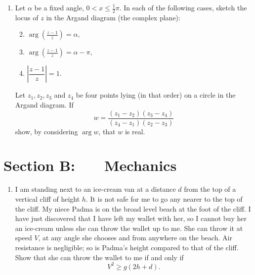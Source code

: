 \documentclass[a4, 11pt]{report}
\newlength{\qspace}
\newcounter{qnumber}
\newenvironment{question}%
 {\vspace{\qspace}
  \begin{enumerate}[\bfseries 1\quad][10]%
    \setcounter{enumi}{\value{qnumber}}%
    \item%
 }
{
  \end{enumerate}
  \filbreak
  \stepcounter{qnumber}
 }
\newenvironment{questionparts}[1][1]%
 {
  \begin{enumerate}[\bfseries (i)]%
    \setcounter{enumii}{#1}
    \addtocounter{enumii}{-1}
    \setlength{\itemsep}{5mm}
    \setlength{\parskip}{8pt}
 }
 {
  \end{enumerate}
 }
\begin{document}
		
			
\begin{question}
Let $\alpha$ be a fixed angle, $0<x\leqslant\frac{1}{2}\pi.$ In
each of the following cases, sketch the locus of $z$ in the Argand
diagram (the complex plane): 


\begin{questionparts}
\item ${\displaystyle \arg\left(\frac{z-1}{z}\right)=\alpha,}$
\item ${\displaystyle \arg\left(\frac{z-1}{z}\right)=\alpha-\pi,}$
\item $\left|\dfrac{z-1}{z}\right|=1.$ 
\end{questionparts}


Let $z_{1},z_{2},z_{3}$ and $z_{4}$ be four points lying (in that
order) on a circle in the Argand diagram. If 
\[
w=\frac{(z_{1}-z_{2})(z_{3}-z_{4})}{(z_{4}-z_{1})(z_{2}-z_{3})}
\]
show, by considering $\arg w$, that $w$ is real. 
\end{question}
		
	
\newpage
\section*{Section B: \ \ \ Mechanics}


	
\begin{question}
I am standing next to an ice-cream van at a distance $d$ from the
top of a vertical cliff of height $h$. It is not safe for me to go
any nearer to the top of the cliff. My niece Padma is on the broad
level beach at the foot of the cliff. I have just discovered that
I have left my wallet with her, so I cannot buy her an ice-cream unless
she can throw the wallet up to me. She can throw it at speed $V$,
at any angle she chooses and from anywhere on the beach. Air resistance
is negligible; so is Padma's height compared to that of the cliff.
Show that she can throw the wallet to me if and only if 
\[
V^{2}\geqslant g(2h+d).
\]
	\end{question}
	
\end{document}
